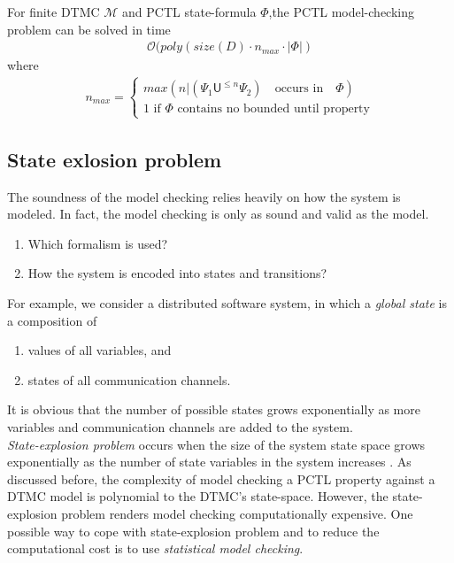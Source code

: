 \begin{theorem}
    For finite DTMC $\mathcal{M}$ and PCTL state-formula $\Phi$,the PCTL model-checking problem can be solved in time
    \begin{align*}
        \mathcal{O}(poly(size(D)\cdot n_{max} \cdot |\Phi|)
    \end{align*}
    where
    \begin{align*}
        n_{max} =
        \begin{cases}
            max(n | (\Psi_1 \mathsf{U}^{\leq n} \Psi_2) \quad\text{occurs in}\quad \Phi) \\
            1 \text{ if $\Phi$ contains no bounded until property}
        \end{cases}
    \end{align*}
\end{theorem}

\subsection{State exlosion problem}
The soundness of the model checking relies heavily on how the system is modeled. In fact, the model
checking is only as sound and valid as the model.
\begin{enumerate}
    \item Which formalism is used?
    \item How the system is encoded into states and transitions?
\end{enumerate}
For example, we consider a distributed software system, in which a \textit{global state} is a
composition of
\begin{enumerate}
    \item values of all variables, and
    \item states of all communication channels.
\end{enumerate}
It is obvious that the number of possible states grows exponentially as more variables and
communication channels are added to the system.\\
\textit{State-explosion problem} occurs when the size of the system state space grows exponentially
as the number of state variables in the system increases \cite{clarke2011model}. As discussed
before, the complexity of model checking a PCTL property against a DTMC model is polynomial to the
DTMC's state-space. However, the state-explosion problem renders model checking computationally
expensive. One possible way to cope with state-explosion problem and to reduce the computational cost is to use \textit{statistical model
    checking}.

